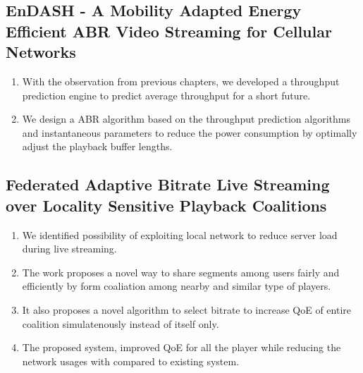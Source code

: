 \subsection{EnDASH - A Mobility Adapted Energy
Efficient ABR Video Streaming for
Cellular Networks}
\begin{enumerate}
	\item With the observation from previous chapters, we developed a throughput prediction engine to predict average throughput for a short future.
	\item We design a ABR algorithm based on the throughput prediction algorithms and instantaneous parameters to reduce the power consumption by optimally adjust the playback buffer lengths.
\end{enumerate}

\subsection{Federated Adaptive Bitrate Live
Streaming over Locality Sensitive
Playback Coalitions}
\begin{enumerate}
	\item We identified possibility of exploiting local network to reduce server load during live streaming.
	\item The work proposes a novel way to share segments among users fairly and efficiently by form coaliation among nearby and similar type of players.
	\item It also proposes a novel algorithm to select bitrate to increase QoE of entire coalition simulatenously instead of itself only.
	\item The proposed system, improved QoE for all the player while reducing the network usages with compared to existing system.
\end{enumerate}